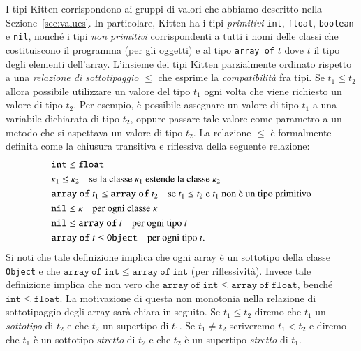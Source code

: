 I tipi Kitten corrispondono ai gruppi di valori che abbiamo descritto
nella Sezione~\ref{sec:values}. In particolare, Kitten ha i tipi
\emph{primitivi} \texttt{int}, \texttt{float}, \texttt{boolean} e
\texttt{nil}, nonch\'e i tipi \emph{non primitivi} corrispondenti
a tutti i nomi delle classi che costituiscono il
programma (per gli oggetti) e al tipo
\texttt{array of} $t$ dove $t$ \e il tipo degli elementi dell'array.
L'insieme dei tipi Kitten \e parzialmente ordinato rispetto a una
\emph{relazione di sottotipaggio} $\le$ che esprime la \emph{compatibilit\`a}
fra tipi. Se $t_1\le t_2$ allora \e possibile utilizzare un valore del
tipo $t_1$ ogni volta che viene richiesto un valore di tipo $t_2$.
Per esempio, \`e possibile assegnare un valore di tipo $t_1$ a una
variabile dichiarata di tipo $t_2$, oppure passare tale valore come parametro
a un metodo che si aspettava un valore di tipo $t_2$.
La relazione $\le$ \`e formalmente definita come
la chiusura transitiva e riflessiva della seguente relazione:
%
\begin{eqnarray*}
  &\mathtt{int}\le\mathtt{float}\\
  &\kappa_1\le\kappa_2\quad\text{se la classe $\kappa_1$ estende la classe $\kappa_2$}\\
  &\mathtt{array\ of\ }t_1\le\mathtt{array\ of\ }t_2\quad
    \text{se $t_1\le t_2$ e $t_1$ non \`e un tipo primitivo}\\
  &\mathtt{nil}\le\kappa\quad\text{per ogni classe $\kappa$}\\
  &\mathtt{nil}\le\mathtt{array\ of\ }t\quad\text{per ogni tipo $t$}\\
  &\mathtt{array\ of\ }t\le\mathtt{Object}\quad\text{per ogni tipo $t$.}
\end{eqnarray*}
%
Si noti che tale definizione implica che ogni array \`e un sottotipo
della classe \texttt{Object} e che
$\mathtt{array\ of\ int}\le\mathtt{array\ of\ int}$ (per riflessivit\`a).
Invece tale definizione implica che non \e vero che
$\mathtt{array\ of\ int}\le\mathtt{array\ of\ float}$, bench\'e
$\mathtt{int}\le\mathtt{float}$. La motivazione di questa non monotonia
nella relazione di sottotipaggio degli array sar\`a chiara in seguito.
Se $t_1\le t_2$ diremo che $t_1$ \e un \emph{sottotipo} di $t_2$ e che
$t_2$ \e un supertipo di $t_1$. Se $t_1\not=t_2$ scriveremo
$t_1<t_2$ e diremo che $t_1$ \`e un sottotipo \emph{stretto}
di $t_2$ e che $t_2$ \`e un supertipo \emph{stretto} di $t_1$.


